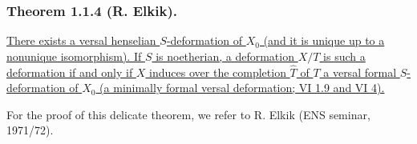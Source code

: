 \subsubsection*{Theorem 1.1.4 (R. Elkik).}
\underline{There exists a versal henselian $S$-deformation of $X_0$
(and it is unique up to a nonunique isomorphism).  If $S$ is
noetherian, a deformation $X/T$ is such a deformation if and only if
$X$ induces over the completion $\widehat T$ of $T$ a versal formal
$S$-deformation of $X_0$ (a minimally formal versal deformation;
VI 1.9 and VI 4).}

For the proof of this delicate theorem, we refer to R. Elkik
(ENS seminar, 1971/72).
